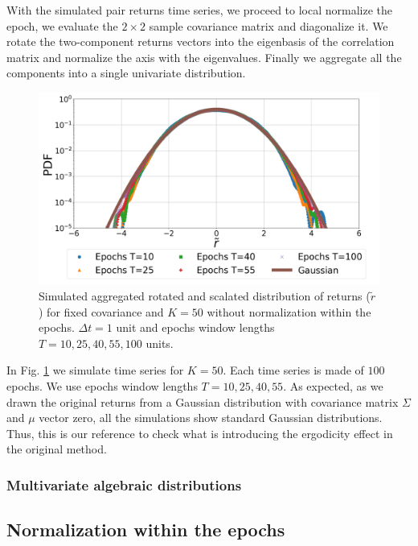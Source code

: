 With the simulated pair returns time series, we proceed to local normalize the
epoch, we evaluate the $2 \times 2$ sample covariance matrix and diagonalize
it. We rotate the two-component returns vectors into the eigenbasis of the
correlation matrix and normalize the axis with the eigenvalues. Finally we
aggregate all the components into a single univariate distribution.

\begin{figure}[htbp]
    \centering
    \includegraphics[width=0.6\columnwidth]
    {figures/06_epochs_sim_agg_ret_pairs_no_norm.png}
    \caption{Simulated aggregated rotated and scalated distribution of returns
             ($\tilde{r}$) for fixed covariance and $K=50$ without
             normalization within the epochs. $\Delta t = 1$ unit and epochs
             window  lengths $T=10, 25, 40, 55, 100$ units.}
    \label{fig:epochs_agg_ret_pairs_no_norm}
\end{figure}

In Fig. \ref{fig:epochs_agg_ret_pairs_no_norm} we simulate time series for
$K = 50$. Each time series is made of $100$ epochs. We use epochs window
lengths $T = 10, 25, 40, 55$. As expected, as we drawn the original returns
from a Gaussian distribution with covariance matrix $\Sigma$ and $\mu$ vector
zero, all the simulations show standard Gaussian distributions. Thus, this is
our reference to check what is introducing the ergodicity effect in the 
original method.

\subsubsection{Multivariate algebraic distributions}\label{subsubsec:alg_sim}

\subsection{Normalization within the epochs}
\label{subsec:norm_epochs_sim}

